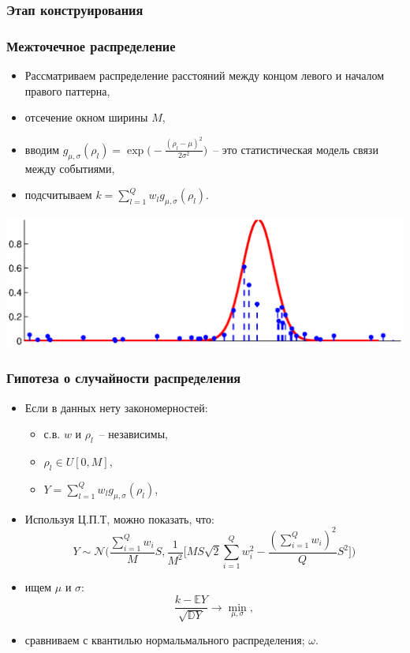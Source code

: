 \documentclass[smaller]{beamer}
\begin{document}
\subsubsection{Этап конструирования}
\begin{frame}
  \frametitle{Межточечное распределение}
  \begin{itemize}
   \item Рассматриваем распределение расстояний между концом левого и началом правого паттерна,
   \item отсечение окном ширины $M$,
   \item вводим $g_{\mu,\sigma}(\rho_l)=\exp\bigl(-\frac{(\rho_l-\mu)^2}{2\sigma^2}\bigr)$~-- это статистическая модель связи между событиями,
   \item подсчитываем $k=\sum_{l=1}^Q w_lg_{\mu,\sigma}(\rho_l).$
   \end{itemize}
   \includegraphics[scale=0.4]{weights.eps}
\end{frame}

\begin{frame}
  \frametitle{Гипотеза о случайности распределения}
  \begin{itemize}
    \item Если в данных нету закономерностей:
    \begin{itemize}
        \item  с.в. $w$ и $\rho_l$~-- независимы,
        \item  $\rho_l \in U[0,M]$,
        \item $Y=\sum_{l=1}^Qw_lg_{\mu,\sigma}(\rho_l)$, 
    \end{itemize}
    \item Используя Ц.П.Т, можно показать, что:
    $$Y\sim \mathcal{N}\biggl( \frac{\sum_{i=1}^Q w_i}MS, \frac1{M^2}\biggl[ MS\sqrt{2}\sum_{i=1}^Q w_i^2-\frac{(\sum_{i=1}^Q w_i)^2}QS^2 \biggr] \biggr)$$
    \item ищем $\mu$ и $\sigma$:
    $$\frac{k-\mathbb{E}Y}{\sqrt{\mathbb{D}Y}}\to\min_{\mu,\sigma},$$
    \item сравниваем с квантилью нормальмального распределения; $\omega$.
   \end{itemize}
\end{frame}
\end{document}
